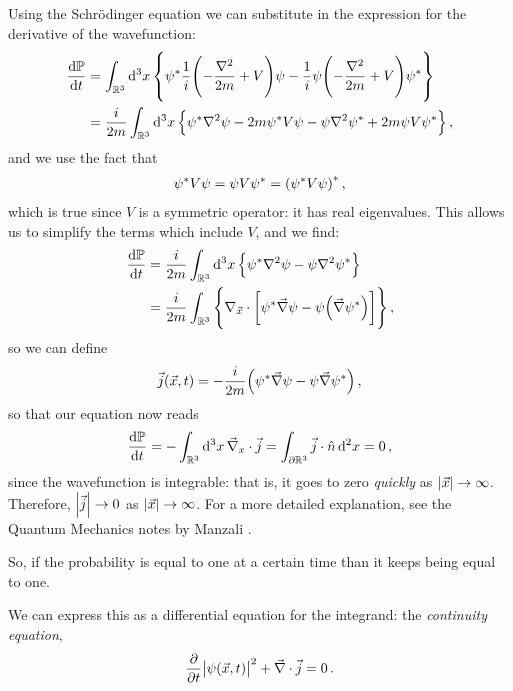 \documentclass[main.tex]{subfiles}
\begin{document}
Using the Schrödinger equation we can substitute in the expression for the derivative of the wavefunction: 
%
\begin{align}
\dv{\mathbb{P}}{t} &= \int_{\mathbb{R}^3} \dd[3]{x} \qty{
\psi^{*}  \frac{1}{i}\qty(-\frac{\nabla^2}{2m}+V) \psi - \frac{1}{i} \psi \qty(- \frac{\nabla^2}{2m} + V) \psi^{*}   
}  \\
&= \frac{i}{2m} \int_{\mathbb{R}^3} \dd[3]{x} \qty{
\psi^{*} \nabla^2 \psi - 2m \psi^{*} V \psi 
- \psi \nabla^2 \psi^{*}
+ 2m \psi V \psi^{*}
}
\,,
\end{align}
%
and we use the fact that 
%
\begin{align}
\psi^{*} V \psi  = \psi V \psi^{*} = \qty(\psi^{*} V \psi )^{*}
\,,
\end{align}
%
which is true since \(V\) is a symmetric operator: it has real eigenvalues. This allows us to simplify the terms which include \(V\), and we find:
%
\begin{align}
\dv{\mathbb{P}}{t} &= \frac{i}{2m} \int_{\mathbb{R}^3 } \dd[3]{x} \qty{
\psi^{*} \nabla^2 \psi 
- \psi \nabla^2 \psi^{*}  
}  \\
&= \frac{i}{2m} \int_{\mathbb{R}^3} \qty{
\nabla_{\vec{x}} \cdot \qty[
\psi^{*} \vec{\nabla} \psi - \psi\qty(\vec{\nabla} \psi^{*})  
]
}
\,,
\end{align}
%
so we can define 
%
\begin{align}
\vec{j} (\vec{x}, t) = - \frac{i}{2m} \qty(\psi^{*} \vec{\nabla} \psi - \psi \vec{\nabla} \psi^{*}  )
\,,
\end{align}
%
so that our equation now reads 
%
\begin{align}
\dv{\mathbb{P}}{t} = - \int_{\mathbb{R}^3} \dd[3]{x} \vec{\nabla}_{x} \cdot \vec{j} 
= \int_{\partial \mathbb{R}^3} \vec{j} \cdot \hat{n} \dd[2]{x} = 0
\,,
\end{align}
%
since the wavefunction is integrable: that is, it goes to zero \emph{quickly} as \(\abs{\vec{x}} \rightarrow \infty \). 
Therefore, \(\abs{\vec{j}} \rightarrow 0\) as \(\abs{\vec{x}} \rightarrow \infty \). For a more detailed explanation, see the Quantum Mechanics notes by Manzali \cite[page 147]{manzaliAppuntiDiFisica2019}.

So, if the probability is equal to one at a certain time than it keeps being equal to one. 

We can express this as a differential equation for the integrand: the \emph{continuity equation}, 
%
\begin{align}
\pdv{}{t} \abs{\psi  (\vec{x}, t)}^2 + \vec{\nabla} \cdot \vec{j} = 0
\,.
\end{align}
\end{document}
